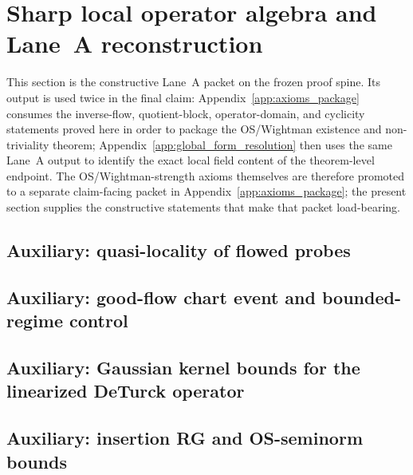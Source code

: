 \section{Sharp local operator algebra and Lane~A reconstruction}
\label{sec:sharp_local}

This section is the constructive Lane~A packet on the frozen proof spine.
Its output is used twice in the final claim: Appendix~\ref{app:axioms_package} consumes the inverse-flow, quotient-block, operator-domain, and cyclicity statements proved here in order to package the OS/Wightman existence and non-triviality theorem; Appendix~\ref{app:global_form_resolution} then uses the same Lane~A output to identify the exact local field content of the theorem-level endpoint.
The OS/Wightman-strength axioms themselves are therefore promoted to a separate claim-facing packet in Appendix~\ref{app:axioms_package}; the present section supplies the constructive statements that make that packet load-bearing.

\subsection{Auxiliary: quasi-locality of flowed probes}


\subsection{Auxiliary: good-flow chart event and bounded-regime control}
\label{sec:good_flow_chart}


\subsection{Auxiliary: Gaussian kernel bounds for the linearized DeTurck operator}


\subsection{Auxiliary: insertion RG and OS-seminorm bounds}





